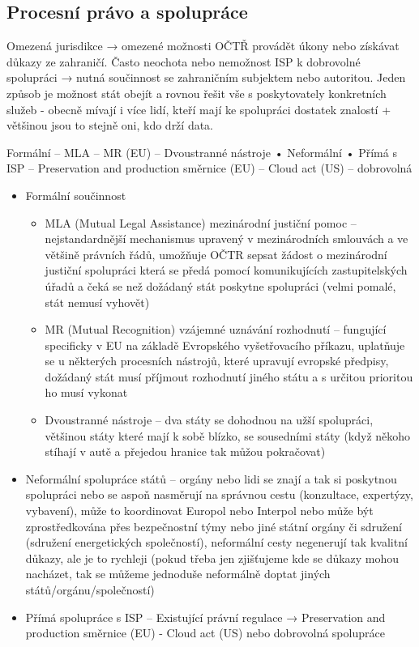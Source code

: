 \subsection{Procesní právo a spolupráce}
Omezená jurisdikce → omezené možnosti OČTŘ provádět úkony nebo získávat důkazy ze zahraničí. Často neochota nebo nemožnost ISP k dobrovolné spolupráci → nutná součinnost se zahraničním subjektem nebo autoritou. Jeden způsob je možnost stát obejít a rovnou řešit vše s poskytovately konkretních služeb - obecně mívají i více lidí, kteří mají ke spolupráci dostatek znalostí + většinou jsou to stejně oni, kdo drží data.


Formální
– MLA
– MR (EU)
– Dvoustranné nástroje
• Neformální
• Přímá s ISP
– Preservation and production směrnice (EU)
– Cloud act (US)
– dobrovolná
\begin{itemize}
    \item Formální součinnost
    \begin{itemize}
        \item MLA (Mutual Legal Assistance) mezinárodní justiční pomoc -- nejstandardnější mechanismus upravený v mezinárodních smlouvách a ve většině právních řádů, umožňuje OČTR sepsat žádost o mezinárodní justiční spolupráci která se předá pomocí komunikujících zastupitelských úřadů a čeká se než dožádaný stát poskytne spolupráci (velmi pomalé, stát nemusí vyhovět)
        \item MR (Mutual Recognition) vzájemné uznávání rozhodnutí -- fungující specificky v EU na základě Evropského vyšetřovacího příkazu, uplatňuje se u některých procesních nástrojů, které upravují evropské předpisy, dožádaný stát musí příjmout rozhodnutí jiného státu a s určitou prioritou ho musí vykonat
        \item Dvoustranné nástroje -- dva státy se dohodnou na užší spolupráci, většinou státy které mají k sobě blízko, se sousedními státy (když někoho stíhají v autě a přejedou hranice tak můžou pokračovat)
    \end{itemize}
    \item Neformální spolupráce států -- orgány nebo lidi se znají a tak si poskytnou spolupráci nebo se aspoň nasměrují na správnou cestu (konzultace, expertýzy, vybavení), může to koordinovat Europol nebo Interpol nebo může být zprostředkována přes bezpečnostní týmy nebo jiné státní orgány či sdružení (sdružení energetických společností), neformální cesty negenerují tak kvalitní důkazy, ale je to rychleji (pokud třeba jen zjišťujeme kde se důkazy mohou nacházet, tak se můžeme jednoduše neformálně doptat jiných států/orgánu/společností)    \item Přímá spolupráce s ISP -- Existující právní regulace → Preservation and production směrnice (EU) - Cloud act (US) nebo dobrovolná spolupráce
\end{itemize}

